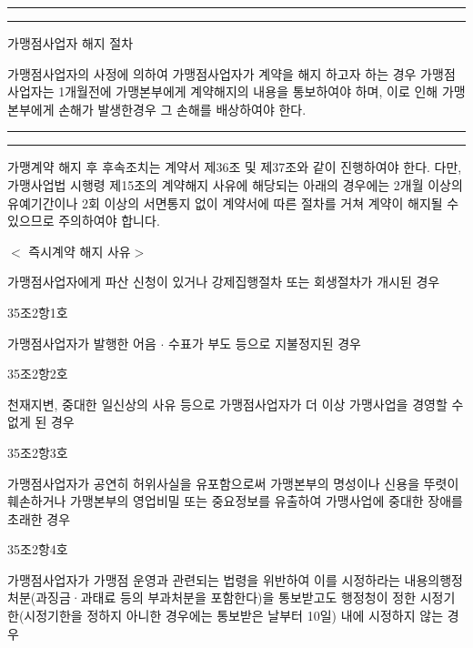 \documentclass[a5paper,10pt]{oblivoir}
\newcommand\crule[3][black]{\textcolor{#1}{\rule{#2}{#3}}}
\begin{document}
\begin{enumerate}
\newpage
\begin{center}
\crule[red]{4cm}{0.1cm} \crule[blue]{4cm}{0.1cm}
\end{center}

 가맹점사업자 해지 절차

가맹점사업자의 사정에 의하여 가맹점사업자가 계약을 해지 하고자 하는 경우 가맹점사업자는 1개월전에 가맹본부에게 계약해지의 내용을 통보하여야 하며, 이로 인해 가맹본부에게 손해가 발생한경우 그 손해를 배상하여야 한다.

\newpage
\begin{center}
\crule[red]{4cm}{0.1cm} \crule[blue]{4cm}{0.1cm}
\end{center}
가맹계약 해지 후 후속조치는 계약서 제36조 및 제37조와 같이 진행하여야 한다.
다만, 가맹사업법 시행령 제15조의 계약해지 사유에 해당되는 아래의 경우에는 2개월 이상의 유예기간이나 2회 이상의 서면통지 없이 계약서에 따른 절차를 거쳐 계약이 해지될 수 있으므로 주의하여야 합니다.
\begin{tiny}
\begin{center}$<$  즉시계약 해지 사유$>$ \end{center}

\begin{Form}
\def\LayoutCheckField#1#2{%
  \parbox[c][5mm]{5mm}{\centering\footnotesize\strut #1\\#2}%
}
\def\LayoutCheckField#1#2{%
  \makebox[0pt][l]{%
    \makebox[5mm][c]{\footnotesize\strut #1}%
  }%
  #2%
}
\def\DefaultHeightofCheckBox{5mm}
\def\DefaultWidthofCheckBox{5mm}

 가맹점사업자에게 파산 신청이 있거나 강제집행절차 또는 회생절차가 개시된 경우

\noindent\dotfill 
35조2항1호

 가맹점사업자가 발행한 어음 $\cdot$ 수표가 부도 등으로 지불정지된 경우

\noindent\dotfill 
35조2항2호

천재지변, 중대한 일신상의 사유 등으로 가맹점사업자가 더 이상 가맹사업을 경영할 수 없게 된 경우

\noindent\dotfill 
35조2항3호

가맹점사업자가 공연히 허위사실을 유포함으로써 가맹본부의 명성이나 신용을 뚜렷이훼손하거나 가맹본부의 영업비밀 또는 중요정보를 유출하여 가맹사업에 중대한 장애를 초래한 경우

\noindent\dotfill 
35조2항4호


가맹점사업자가 가맹점 운영과 관련되는 법령을 위반하여 이를 시정하라는 내용의행정처분(과징금·과태료 등의 부과처분을 포함한다)을 통보받고도 행정청이 정한 시정기한(시정기한을 정하지 아니한 경우에는 통보받은 날부터 10일) 내에 시정하지 않는 경우


\end{Form}
\end{tiny}
\end{enumerate}
\end{document}

